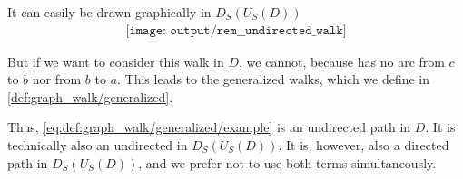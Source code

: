 \begin{remark}
  It can easily be drawn graphically in \( D_S(U_S(D)) \)
  \begin{equation*}
    \begin{aligned}
      \texttt{[image: output/rem\_\_undirected\_walk]}
    \end{aligned}
  \end{equation*}

  But if we want to consider this walk in \( D \), we cannot, because has no arc from \( c \) to \( b \) nor from \( b \) to \( a \). This leads to the generalized walks, which we define in \cref{def:graph_walk/generalized}.

  Thus, \eqref{eq:def:graph_walk/generalized/example} is an undirected path in \( D \). It is technically also an undirected in \( D_S(U_S(D)) \). It is, however, also a directed path in \( D_S(U_S(D)) \), and we prefer not to use both terms simultaneously.
\end{remark}

